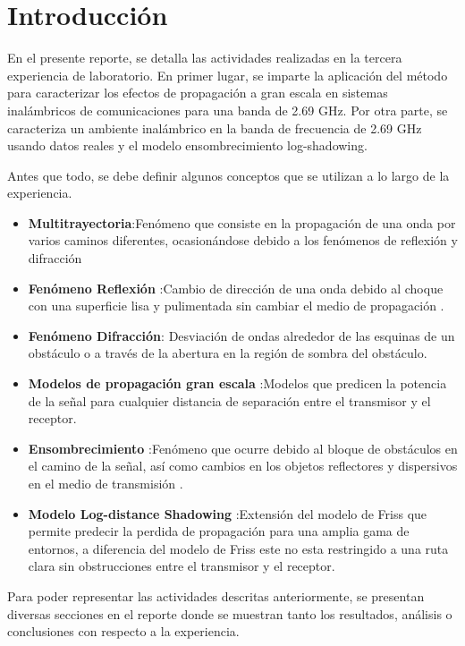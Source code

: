 \section{Introducción}\label{sec:introducción}
En el presente reporte, se detalla las actividades realizadas en la tercera experiencia de laboratorio. En primer lugar, se imparte la aplicación del método para caracterizar los efectos de propagación a gran escala en sistemas inalámbricos de comunicaciones para una banda de 2.69 GHz. Por otra parte, se caracteriza un ambiente inalámbrico en la banda de frecuencia de 2.69 GHz usando datos reales y el modelo ensombrecimiento log-shadowing.

Antes que todo, se debe definir algunos conceptos que se utilizan a lo largo de la experiencia.

\begin{itemize}
    \item \textbf{Multitrayectoria}:Fenómeno que consiste en la propagación de una onda por varios caminos diferentes, ocasionándose debido a los fenómenos de reflexión y difracción
   \item \textbf{Fenómeno Reflexión }:Cambio de dirección de una onda debido al choque con una superficie lisa y pulimentada sin cambiar el medio de propagación \cite{efect}.
   \item \textbf{Fenómeno Difracción}: Desviación de ondas alrededor de las esquinas de un obstáculo o a través de la abertura en la región de sombra del obstáculo\cite{efect}.
    \item \textbf{Modelos de propagación gran escala }:Modelos que predicen la potencia de la señal para cualquier distancia de separación entre el transmisor y el receptor.
      \item \textbf{Ensombrecimiento }:Fenómeno que ocurre debido al bloque de obstáculos en el camino de la señal, así como cambios en los objetos reflectores y dispersivos en el medio de transmisión \cite{shadow}.
      \item\textbf{Modelo Log-distance Shadowing }:Extensión del modelo de Friss que permite predecir la perdida de propagación para una amplia gama de entornos, a diferencia del modelo de Friss este no esta restringido a una ruta clara sin obstrucciones entre el transmisor y el receptor\cite{tabla}.
    
\end{itemize}



Para poder representar las actividades descritas anteriormente, se presentan diversas secciones en el reporte donde se muestran tanto los resultados, análisis o conclusiones con respecto a la experiencia.